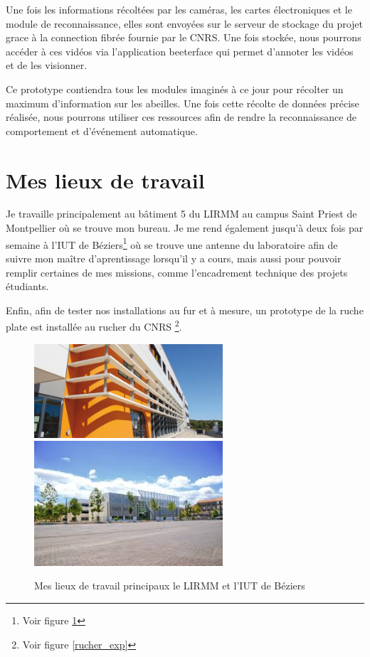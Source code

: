 \documentclass[11pt,french,a4paper]{report}
\begin{document}
Une fois les informations récoltées par les caméras, les cartes électroniques et le module de reconnaissance, elles sont envoyées 
sur le serveur de stockage du projet grace à la connection fibrée fournie par le CNRS. Une fois stockée, nous pourrons accéder à ces 
vidéos via l'application beeterface qui permet d'annoter les vidéos et de les visionner. 

Ce prototype contiendra tous les modules imaginés à ce jour pour récolter un maximum d'information sur les abeilles. Une fois
cette récolte de données précise réalisée, nous pourrons utiliser ces ressources afin de rendre la reconnaissance de comportement 
et d'événement automatique. 


\section{Mes lieux de travail}

Je travaille principalement au bâtiment 5 du LIRMM au campus Saint Priest de Montpellier où se trouve mon bureau. 
Je me rend également jusqu'à deux fois par semaine à l'IUT de Béziers\footnote{Voir figure \ref{lirmm_iut}} où se trouve une antenne du laboratoire afin de suivre
mon maître d'aprentissage lorsqu'il y a cours, mais aussi pour pouvoir remplir certaines de mes missions, comme l'encadrement
technique des projets étudiants. 

Enfin, afin de tester nos installations au fur et à mesure, un prototype de la ruche plate est installée au rucher du CNRS
\footnote{Voir figure \ref{rucher_exp}}.

\begin{figure}[!h]
    \centering 
    \includegraphics[width=7cm]{./img/photo_lirmm.jpg} 
    \includegraphics[width=7cm]{./img/iut_beziers.jpeg} \\
    \caption{Mes lieux de travail principaux le LIRMM et l'IUT de Béziers}
    \label{lirmm_iut}
\end{figure}
\end{document}
